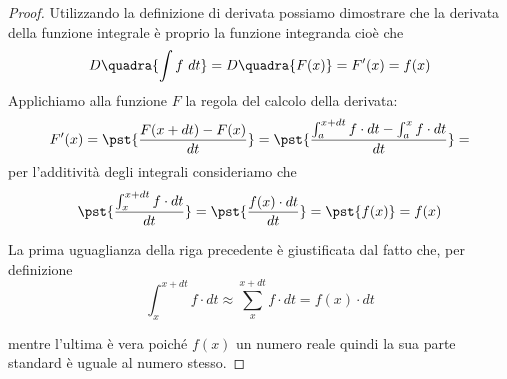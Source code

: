 % 
% 
% 

\begin{proof}
Utilizzando la definizione di derivata possiamo
dimostrare che la derivata della funzione integrale è proprio la 
funzione integranda cioè che  
\[D\quadra{\int f~dt} = D\quadra{F(x)} = F'(x) = f(x)\]
Applichiamo alla funzione \(F\) la regola del calcolo della derivata:
\[F'(x) = \pst{\frac{F(x+dt)-F(x)}{dt}} = 
\pst{\frac{\int_a^{x+dt} f \cdot dt - \int_a^x f \cdot dt}{dt}} =\] 
per l'additività degli integrali consideriamo che
\[\pst{\frac{\int_x^{x+dt} f \cdot dt}{dt}} = 
    \pst{\frac{f(x) \cdot dt}{dt}} = \pst{f(x)} = f(x)\]

La prima uguaglianza della riga
precedente è giustificata dal fatto che, per definizione 
\[\int_x^{x+dt} f \cdot dt \approx \sum_x^{x+dt} f \cdot dt = f(x) \cdot dt\]

mentre l'ultima è vera poiché \(f(x)\) un numero reale quindi la sua parte 
standard è uguale al numero stesso. 
\end{proof}


